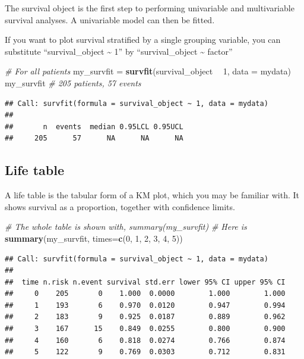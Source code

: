 \documentclass[]{book}
\makeatletter
\newenvironment{Shaded}{\begin{snugshade}}{\end{snugshade}}
\newcommand{\CommentTok}[1]{\textcolor[rgb]{0.56,0.35,0.01}{\textit{#1}}}
\newcommand{\DataTypeTok}[1]{\textcolor[rgb]{0.13,0.29,0.53}{#1}}
\newcommand{\DecValTok}[1]{\textcolor[rgb]{0.00,0.00,0.81}{#1}}
\newcommand{\KeywordTok}[1]{\textcolor[rgb]{0.13,0.29,0.53}{\textbf{#1}}}
\newcommand{\NormalTok}[1]{#1}
\newcommand{\OperatorTok}[1]{\textcolor[rgb]{0.81,0.36,0.00}{\textbf{#1}}}
\newcommand{\StringTok}[1]{\textcolor[rgb]{0.31,0.60,0.02}{#1}}
\newenvironment{kframe}{%
\medskip{}
\setlength{\fboxsep}{.8em}
 \def\at@end@of@kframe{}%
 \ifinner\ifhmode%
  \def\at@end@of@kframe{\end{minipage}}%
  \begin{minipage}{\columnwidth}%
 \fi\fi%
 \def\FrameCommand##1{\hskip\@totalleftmargin \hskip-\fboxsep
 \colorbox{shadecolor}{##1}\hskip-\fboxsep
     \hskip-\linewidth \hskip-\@totalleftmargin \hskip\columnwidth}%
 \MakeFramed {\advance\hsize-\width
   \@totalleftmargin\z@ \linewidth\hsize
   \@setminipage}}%
 {\par\unskip\endMakeFramed%
 \at@end@of@kframe}
\renewenvironment{Shaded}{\begin{kframe}}{\end{kframe}}
\theoremstyle{definition}
\theoremstyle{definition}
\theoremstyle{definition}
\theoremstyle{remark}
\makeatother
\begin{document}
The survival object is the first step to performing univariable and
multivariable survival analyses. A univariable model can then be fitted.

If you want to plot survival stratified by a single grouping variable,
you can substitute ``survival\_object \textasciitilde{} 1'' by
``survival\_object \textasciitilde{} factor''

\begin{Shaded}
\begin{Highlighting}[]
\CommentTok{# For all patients}
\NormalTok{my_survfit =}\StringTok{ }\KeywordTok{survfit}\NormalTok{(survival_object }\OperatorTok{~}\StringTok{ }\DecValTok{1}\NormalTok{, }\DataTypeTok{data =}\NormalTok{ mydata)}
\NormalTok{my_survfit }\CommentTok{# 205 patients, 57 events}
\end{Highlighting}
\end{Shaded}

\begin{verbatim}
## Call: survfit(formula = survival_object ~ 1, data = mydata)
## 
##       n  events  median 0.95LCL 0.95UCL 
##     205      57      NA      NA      NA
\end{verbatim}

\hypertarget{life-table}{%
\subsection{Life table}\label{life-table}}

A life table is the tabular form of a KM plot, which you may be familiar
with. It shows survival as a proportion, together with confidence
limits.

\begin{Shaded}
\begin{Highlighting}[]
\CommentTok{# The whole table is shown with, summary(my_survfit)}
\CommentTok{# Here is }
\KeywordTok{summary}\NormalTok{(my_survfit, }\DataTypeTok{times=}\KeywordTok{c}\NormalTok{(}\DecValTok{0}\NormalTok{, }\DecValTok{1}\NormalTok{, }\DecValTok{2}\NormalTok{, }\DecValTok{3}\NormalTok{, }\DecValTok{4}\NormalTok{, }\DecValTok{5}\NormalTok{))}
\end{Highlighting}
\end{Shaded}

\begin{verbatim}
## Call: survfit(formula = survival_object ~ 1, data = mydata)
## 
##  time n.risk n.event survival std.err lower 95% CI upper 95% CI
##     0    205       0    1.000  0.0000        1.000        1.000
##     1    193       6    0.970  0.0120        0.947        0.994
##     2    183       9    0.925  0.0187        0.889        0.962
##     3    167      15    0.849  0.0255        0.800        0.900
##     4    160       6    0.818  0.0274        0.766        0.874
##     5    122       9    0.769  0.0303        0.712        0.831
\end{verbatim}
\end{document}

